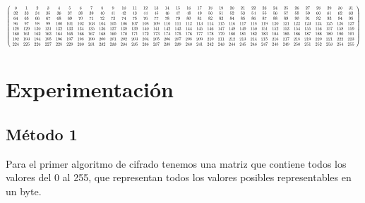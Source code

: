 \documentclass[a4paper]{article}
\newcommand*{\Scale}[2][4]{\scalebox{#1}{$#2$}}%
\begin{document}
\[
\Scale[0.5]{
\left(
\begin{array}{cccccccccccccccccccccccccccccccc}
 0 & 1 & 2 & 3 & 4 & 5 & 6 & 7 & 8 & 9 & 10 & 11 & 12 & 13 & 14 & 15 & 16 & 17
& 18 & 19 & 20 & 21 & 22 & 23 & 24 & 25 & 26 & 27 & 28 & 29 & 30 & 31 \\
 32 & 33 & 34 & 35 & 36 & 37 & 38 & 39 & 40 & 41 & 42 & 43 & 44 & 45 & 46 & 47
& 48 & 49 & 50 & 51 & 52 & 53 & 54 & 55 & 56 & 57 & 58 & 59 & 60 & 61 & 62 & 63
\\
 64 & 65 & 66 & 67 & 68 & 69 & 70 & 71 & 72 & 73 & 74 & 75 & 76 & 77 & 78 & 79
& 80 & 81 & 82 & 83 & 84 & 85 & 86 & 87 & 88 & 89 & 90 & 91 & 92 & 93 & 94 & 95
\\
 96 & 97 & 98 & 99 & 100 & 101 & 102 & 103 & 104 & 105 & 106 & 107 & 108 & 109
& 110 & 111 & 112 & 113 & 114 & 115 & 116 & 117 & 118 & 119 & 120 & 121 & 122 &
123 & 124 & 125 & 126 & 127 \\
 128 & 129 & 130 & 131 & 132 & 133 & 134 & 135 & 136 & 137 & 138 & 139 & 140 &
141 & 142 & 143 & 144 & 145 & 146 & 147 & 148 & 149 & 150 & 151 & 152 & 153 &
154 & 155 & 156 & 157 & 158 & 159 \\
 160 & 161 & 162 & 163 & 164 & 165 & 166 & 167 & 168 & 169 & 170 & 171 & 172 &
173 & 174 & 175 & 176 & 177 & 178 & 179 & 180 & 181 & 182 & 183 & 184 & 185 &
186 & 187 & 188 & 189 & 190 & 191 \\
 192 & 193 & 194 & 195 & 196 & 197 & 198 & 199 & 200 & 201 & 202 & 203 & 204 &
205 & 206 & 207 & 208 & 209 & 210 & 211 & 212 & 213 & 214 & 215 & 216 & 217 &
218 & 219 & 220 & 221 & 222 & 223 \\
 224 & 225 & 226 & 227 & 228 & 229 & 230 & 231 & 232 & 233 & 234 & 235 & 236 &
237 & 238 & 239 & 240 & 241 & 242 & 243 & 244 & 245 & 246 & 247 & 248 & 249 &
250 & 251 & 252 & 253 & 254 & 255 \\
\end{array}
\right)
}
\]
    
\section{Experimentación}

\subsection{Método 1}

Para el primer algoritmo de cifrado tenemos una matriz que contiene todos los
valores del 0 al 255, que representan todos los valores posibles representables
en un byte.
\end{document}
